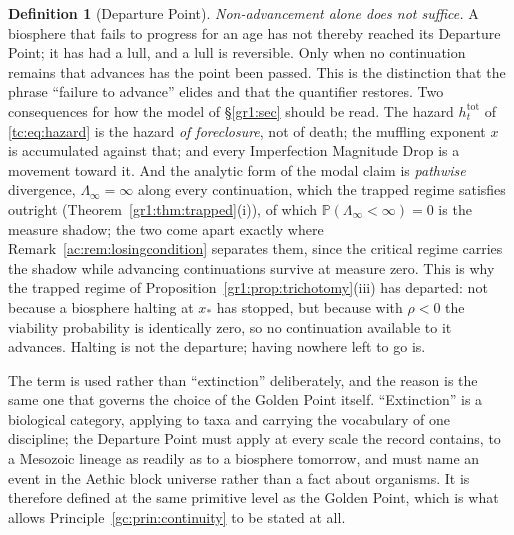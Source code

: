 \documentclass[11pt]{article}
\numberwithin{equation}{section}
\theoremstyle{plain}
\theoremstyle{definition}
\newtheorem{definition}[theorem]{Definition}
\theoremstyle{remark}
\newcommand{\PP}{\mathbb{P}}
\begin{document}
\begin{definition}[Departure Point]
\emph{Non-advancement alone does not suffice.} A biosphere that fails
to progress for an age has not thereby reached its Departure Point; it
has had a lull, and a lull is reversible. Only when no continuation
remains that advances has the point been passed. This is the
distinction that the phrase ``failure to advance'' elides and that the
quantifier restores. Two consequences for how the model of \S\ref{gr1:sec} should be read.
The hazard $h^{\mathrm{tot}}_t$ of \eqref{tc:eq:hazard} is the hazard
\emph{of foreclosure}, not of death; the muffling exponent $x$ is
accumulated against that; and every Imperfection Magnitude Drop is a
movement toward it. And the analytic form of the modal claim is \emph{pathwise}
divergence, $\Lambda_\infty=\infty$ along every continuation, which
the trapped regime satisfies outright
(Theorem~\ref{gr1:thm:trapped}(i)), of which
$\PP(\Lambda_\infty<\infty)=0$ is the measure shadow; the two come
apart exactly where Remark~\ref{ac:rem:losingcondition} separates
them, since the critical regime carries the shadow while advancing
continuations survive at measure zero. This is why the
trapped regime of Proposition~\ref{gr1:prop:trichotomy}(iii) has
departed: not because a biosphere halting at $x_\ast$ has stopped, but
because with $\rho<0$ the viability probability is identically zero, so
no continuation available to it advances. Halting is not the departure;
having nowhere left to go is.

The term is used rather than ``extinction'' deliberately, and the
reason is the same one that governs the choice of the Golden Point
itself. ``Extinction'' is a biological category, applying to taxa and
carrying the vocabulary of one discipline; the Departure Point must
apply at every scale the record contains, to a Mesozoic lineage as
readily as to a biosphere tomorrow, and must name an event in the
Aethic block universe rather than a fact about organisms. It is
therefore defined at the same primitive level as the Golden Point,
which is what allows Principle~\ref{gc:prin:continuity} to be stated at
all.


\end{definition}
\end{document}
